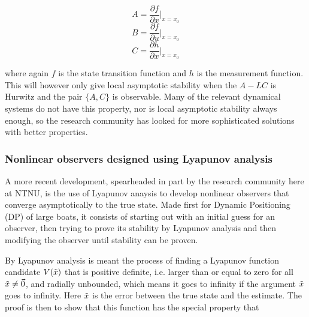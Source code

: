 \begin{equation}
    A = \frac{\partial f}{\partial x}|_{x=x_0}
\end{equation}
\begin{equation}
    B = \frac{\partial f}{\partial u}|_{x=x_0}
\end{equation}
\begin{equation}
    C = \frac{\partial h}{\partial x}|_{x=x_0}
\end{equation}

where again $f$ is the state transition function and $h$ is the measurement function. This will however only give local asymptotic stability when the $A-LC$ is Hurwitz and the pair $\{A,C\}$ is observable. Many of the relevant dynamical systems do not have this property, nor is local asymptotic stability always enough, so the research community has looked for more sophisticated solutions with better properties. 

\subsubsection{Nonlinear observers designed using Lyapunov analysis}

A more recent development, spearheaded in part by the research community here at NTNU, is the use of Lyapunov anaysis to develop nonlinear observers that converge asymptotically to the true state\cite{PassiveFossen}. Made first for Dynamic Positioning (DP) of large boats, it consists of starting out with an initial guess for an observer, then trying to prove its stability by Lyapunov analysis and then modifying the observer until stability can be proven. 

By Lyapunov analysis\cite{Lyapunov} is meant the process of finding a Lyapunov function candidate $V(\Tilde{x})$ that is positive definite, i.e. larger than or equal to zero for all $\Tilde{x}\neq \Vec{0}$, and radially unbounded, which means it goes to infinity if the argument $\Tilde{x}$ goes to infinity. Here $\Tilde{x}$ is the error between the true state and the estimate. The proof is then to show that this function has the special property that

